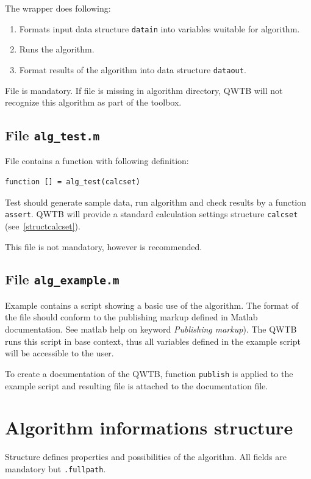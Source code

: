 \documentclass[12pt,a4paper,oneside]{report} %
\begin{document}
The wrapper does following:
\begin{enumerate}
        \item Formats input data structure \lstinline{datain} into variables wuitable for algorithm.
        \item Runs the algorithm.
        \item Format results of the algorithm into data structure \lstinline{dataout}.
\end{enumerate}

File is mandatory. If file is missing in algorithm directory, QWTB will not recognize this
algorithm as part of the toolbox.

\subsection{File {\tt alg\_test.m}} %
\label{filealgtest}
File contains a function with following definition:

\begin{lstlisting}
function [] = alg_test(calcset)
\end{lstlisting}

Test should generate sample data, run algorithm and check results by a function \lstinline{assert}.
QWTB will provide a standard calculation settings structure \lstinline{calcset} (see~\ref{structcalcset}).

This file is not mandatory, however is recommended.

\subsection{File {\tt alg\_example.m}} %
\label{filealgexample}

Example contains a script showing a basic use of the algorithm. The format of the file should
conform to the publishing markup defined in Matlab documentation. See matlab help on keyword
\emph{Publishing markup}). The QWTB runs this script in base context, thus all variables defined in
the example script will be accessible to the user.

To create a documentation of the QWTB, function \lstinline{publish} is applied to the example script
and resulting file is attached to the documentation file.

\section{Algorithm informations structure} %
\label{structalginfo}
Structure defines properties and possibilities of the algorithm. All fields are mandatory but
\lstinline{.fullpath}.
\end{document}
